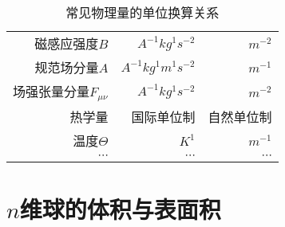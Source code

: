 \begin{table}[!htbp]
\begin{tabular*}{\hsize}{@{}@{\extracolsep{\fill}}rrr@{}}
				磁感应强度$B$					&	$A^{-1}kg^{1}s^{-2}$					&	 $m^{-2}$					\\
				规范场分量$A$					&	$A^{-1}kg^{1}m^{1}s^{-2}$				&	 $m^{-1}$					\\
				场强张量分量$F_{\mu\nu}$		&	$A^{-1}kg^{1}s^{-2}$					&	 $m^{-2}$					\\
				\midrule
				热学量							&				国际单位制					&	自然单位制	\\
				\midrule
				温度$\varTheta$					&	$K^{1}$									&	 $m^{-1}$					\\
				$\cdots$						&	$\cdots$								&	 $\cdots$					\\




					
				\bottomrule
			\end{tabular*}
			\caption{常见物理量的单位换算关系}\label{tab:Dimensional}
			\end{table}
			
			\newpage


		\section{$n$维球的体积与表面积}\label{sec:N-sphere}

